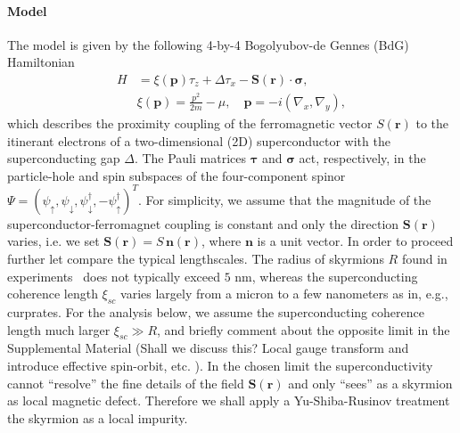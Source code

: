 \documentclass[twocolumn,showpacs,floatfix,nofootinbib,longbibliography]{revtex4-1}
\begin{document}
\paragraph*{Model}  \label{sec:model}
The model is given by the following 4-by-4 Bogolyubov-de Gennes (BdG) Hamiltonian 
\begin{align}
	 H &= \xi(\bm p)\tau_z+\Delta \tau_x - \bm S(\bm r)\cdot\bm\sigma, \label{ham} \\
  & \xi(\bm p) = \frac{p^2}{2m}-\mu,\quad \bm p = -i(\nabla_x,\nabla_y),
\end{align}
which describes the proximity coupling of the ferromagnetic vector $S(\bm r)$ to the itinerant electrons of a two-dimensional (2D) superconductor with the superconducting gap $\Delta$. The Pauli matrices $\bm \tau$ and $\bm \sigma$ act, respectively, in the particle-hole and spin subspaces of the four-component spinor $\Psi = (\psi_\uparrow,\psi_\downarrow,\psi^\dagger_\downarrow,-\psi^\dagger_\uparrow)^T$. For simplicity, we assume that the magnitude of the superconductor-ferromagnet coupling is constant and only the direction $\bm S(\bm r)$ varies, i.e. we set $\bm S(\bm r) = S\,\bm n(\bm r)$, where $\bm n$ is a unit vector. In order to proceed further let compare the typical lengthscales. The radius of skyrmions $R$ found in experiments~\cite{Heinze2011,Romming2013,Bergmann2014,Brede2014,Sonntag2014,vonBergmann2015,Romming2015} does not typically exceed $5$ nm, whereas the superconducting coherence length $\xi_{sc}$ varies largely from a micron to a few nanometers as in, e.g., curprates. For the analysis below, we assume the superconducting coherence length much larger $\xi_{sc}\gg R$, and briefly comment about the opposite limit in the Supplemental Material (Shall we discuss this? Local gauge transform and introduce effective spin-orbit, etc. ). In the chosen limit the superconductivity cannot ``resolve'' the fine details of the field $\bm S(\bm r)$ and only ``sees'' as a skyrmion as local magnetic defect. Therefore we shall apply a Yu-Shiba-Rusinov \cite{Yu,Shiba,Rusinov,Balatsky2006} treatment the skyrmion as a local impurity. 
\end{document}
